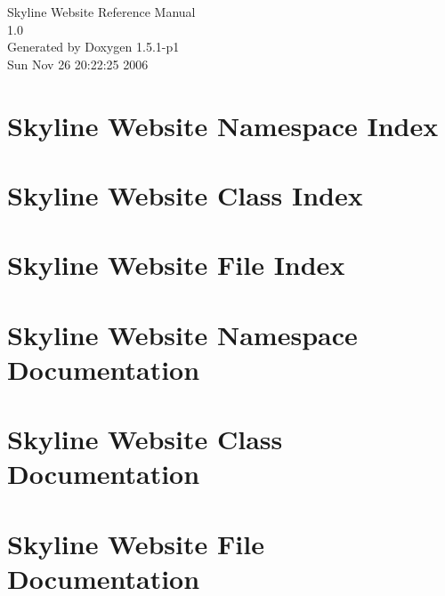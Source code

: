 \documentclass[a4paper]{book}
\begin{document}
\begin{titlepage}
\vspace*{7cm}
\begin{center}
{\Large Skyline Website Reference Manual\\[1ex]\large 1.0 }\\
\vspace*{1cm}
{\large Generated by Doxygen 1.5.1-p1}\\
\vspace*{0.5cm}
{\small Sun Nov 26 20:22:25 2006}\\
\end{center}
\end{titlepage}
\clearemptydoublepage
{}
\tableofcontents
\clearemptydoublepage
{}
\chapter{Skyline Website Namespace Index}

\chapter{Skyline Website Class Index}

\chapter{Skyline Website File Index}

\chapter{Skyline Website Namespace Documentation}













\chapter{Skyline Website Class Documentation}








\chapter{Skyline Website File Documentation}








\printindex
\end{document}
